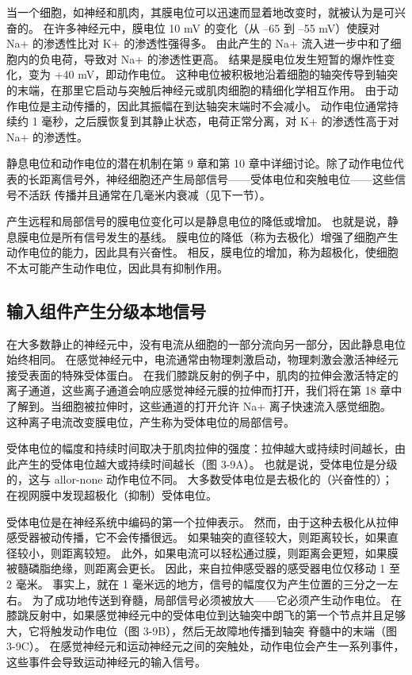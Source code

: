 当一个细胞，如神经和肌肉，其膜电位可以迅速而显着地改变时，就被认为是可兴奋的。 在许多神经元中，膜电位 10 mV 的变化（从 –65 到 –55 mV）使膜对 Na+ 的渗透性比对 K+ 的渗透性强得多。 由此产生的 Na+ 流入进一步中和了细胞内的负电荷，导致对 Na+ 的渗透性更高。 结果是膜电位发生短暂的爆炸性变化，变为 +40 mV，即动作电位。 这种电位被积极地沿着细胞的轴突传导到轴突的末端，在那里它启动与突触后神经元或肌肉细胞的精细化学相互作用。 由于动作电位是主动传播的，因此其振幅在到达轴突末端时不会减小。 动作电位通常持续约 1 毫秒，之后膜恢复到其静止状态，电荷正常分离，对 K+ 的渗透性高于对 Na+ 的渗透性。

静息电位和动作电位的潜在机制在第 9 章和第 10 章中详细讨论。除了动作电位代表的长距离信号外，神经细胞还产生局部信号——受体电位和突触电位——这些信号不活跃 传播并且通常在几毫米内衰减（见下一节）。

产生远程和局部信号的膜电位变化可以是静息电位的降低或增加。 也就是说，静息膜电位是所有信号发生的基线。 膜电位的降低（称为去极化）增强了细胞产生动作电位的能力，因此具有兴奋性。 相反，膜电位的增加，称为超极化，使细胞不太可能产生动作电位，因此具有抑制作用。


\subsection{输入组件产生分级本地信号}
在大多数静止的神经元中，没有电流从细胞的一部分流向另一部分，因此静息电位始终相同。 在感觉神经元中，电流通常由物理刺激启动，物理刺激会激活神经元接受表面的特殊受体蛋白。 在我们膝跳反射的例子中，肌肉的拉伸会激活特定的离子通道，这些离子通道会响应感觉神经元膜的拉伸而打开，我们将在第 18 章中了解到。当细胞被拉伸时，这些通道的打开允许 Na+ 离子快速流入感觉细胞。 这种离子电流改变膜电位，产生称为受体电位的局部信号。

受体电位的幅度和持续时间取决于肌肉拉伸的强度：拉伸越大或持续时间越长，由此产生的受体电位越大或持续时间越长（图 3-9A）。 也就是说，受体电位是分级的，这与 allor-none 动作电位不同。 大多数受体电位是去极化的（兴奋性的）； 在视网膜中发现超极化（抑制）受体电位。

受体电位是在神经系统中编码的第一个拉伸表示。 然而，由于这种去极化从拉伸感受器被动传播，它不会传播很远。 如果轴突的直径较大，则距离较长，如果直径较小，则距离较短。 此外，如果电流可以轻松通过膜，则距离会更短，如果膜被髓磷脂绝缘，则距离会更长。 因此，来自拉伸感受器的感受器电位仅移动 1 至 2 毫米。 事实上，就在 1 毫米远的地方，信号的幅度仅为产生位置的三分之一左右。 为了成功地传送到脊髓，局部信号必须被放大——它必须产生动作电位。 在膝跳反射中，如果感觉神经元中的受体电位到达轴突中朗飞的第一个节点并且足够大，它将触发动作电位（图 3-9B），然后无故障地传播到轴突 脊髓中的末端（图 3-9C）。 在感觉神经元和运动神经元之间的突触处，动作电位会产生一系列事件，这些事件会导致运动神经元的输入信号。

